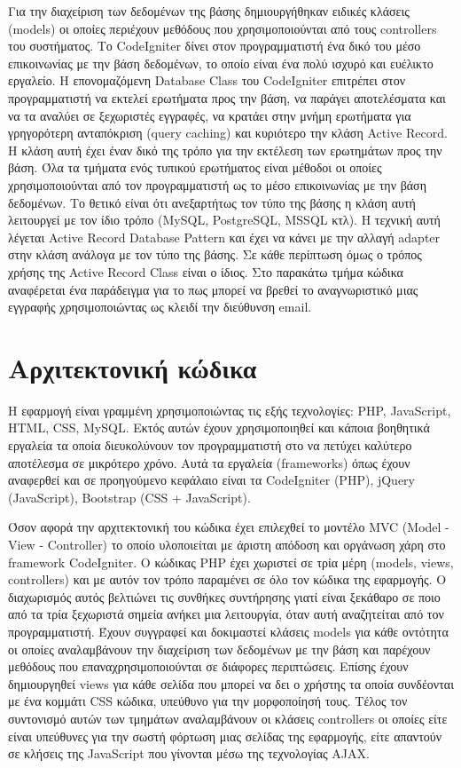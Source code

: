 Για την διαχείριση των δεδομένων της βάσης δημιουργήθηκαν ειδικές κλάσεις (models) οι οποίες περιέχουν μεθόδους που χρησιμοποιούνται από τους controllers του συστήματος. Το CodeIgniter δίνει στον προγραμματιστή ένα δικό του μέσο επικοινωνίας με την βάση δεδομένων, το οποίο είναι ένα πολύ ισχυρό και ευέλικτο εργαλείο. Η επονομαζόμενη Database Class του CodeIgniter επιτρέπει στον προγραμματιστή να εκτελεί ερωτήματα προς την βάση, να παράγει αποτελέσματα και να τα αναλύει σε ξεχωριστές εγγραφές, να κρατάει στην μνήμη ερωτήματα για γρηγορότερη ανταπόκριση (query caching) και κυριότερο την κλάση Active Record. Η κλάση αυτή έχει έναν δικό της τρόπο για την εκτέλεση των ερωτημάτων προς την βάση. Όλα τα τμήματα ενός τυπικού ερωτήματος είναι μέθοδοι οι οποίες χρησιμοποιούνται από τον προγραμματιστή ως το μέσο επικοινωνίας με την βάση δεδομένων. Το θετικό είναι ότι ανεξαρτήτως τον τύπο της βάσης η κλάση αυτή λειτουργεί με τον ίδιο τρόπο (MySQL, PostgreSQL, MSSQL κτλ). Η τεχνική αυτή λέγεται Active Record Database Pattern και έχει να κάνει με την αλλαγή adapter στην κλάση ανάλογα με τον τύπο της βάσης. Σε κάθε περίπτωση όμως ο τρόπος χρήσης της Active Record Class είναι ο ίδιος. Στο παρακάτω τμήμα κώδικα αναφέρεται ένα παράδειγμα για το πως μπορεί να βρεθεί το αναγνωριστικό μιας εγγραφής χρησιμοποιώντας ως κλειδί την διεύθυνση email.



\section{Αρχιτεκτονική κώδικα}
Η εφαρμογή είναι γραμμένη χρησιμοποιώντας τις εξής τεχνολογίες: PHP, JavaScript, HTML, CSS, MySQL. Εκτός αυτών έχουν χρησιμοποιηθεί και κάποια βοηθητικά εργαλεία τα οποία διευκολύνουν τον προγραμματιστή στο να πετύχει καλύτερο αποτέλεσμα σε μικρότερο χρόνο. Αυτά τα εργαλεία (frameworks) όπως έχουν αναφερθεί και σε προηγούμενο κεφάλαιο είναι τα CodeIgniter (PHP), jQuery (JavaScript), Bootstrap (CSS + JavaScript). 

Όσον αφορά την αρχιτεκτονική του κώδικα έχει επιλεχθεί το μοντέλο MVC (Model - View - Controller) το οποίο υλοποιείται με άριστη απόδοση και οργάνωση χάρη στο framework CodeIgniter. Ο κώδικας PHP έχει χωριστεί σε τρία μέρη (models, views, controllers) και με αυτόν τον τρόπο παραμένει σε όλο τον κώδικα της εφαρμογής. Ο διαχωρισμός αυτός βελτιώνει τις συνθήκες συντήρησης γιατί είναι ξεκάθαρο σε ποιο από τα τρία ξεχωριστά σημεία ανήκει μια λειτουργία, όταν αυτή αναζητείται από τον προγραμματιστή. Έχουν συγγραφεί και δοκιμαστεί κλάσεις models για κάθε οντότητα οι οποίες αναλαμβάνουν την διαχείριση των δεδομένων με την βάση και παρέχουν μεθόδους που επαναχρησιμοποιούνται σε διάφορες περιπτώσεις. Επίσης έχουν δημιουργηθεί views για κάθε σελίδα που μπορεί να δει ο χρήστης τα οποία συνδέονται με ένα κομμάτι CSS κώδικα, υπεύθυνο για την μορφοποίησή τους. Τέλος τον συντονισμό αυτών των τμημάτων αναλαμβάνουν οι κλάσεις controllers οι οποίες είτε είναι υπεύθυνες για την σωστή φόρτωση μιας σελίδας της εφαρμογής, είτε απαντούν σε κλήσεις της JavaScript που γίνονται μέσω της τεχνολογίας AJAX.

